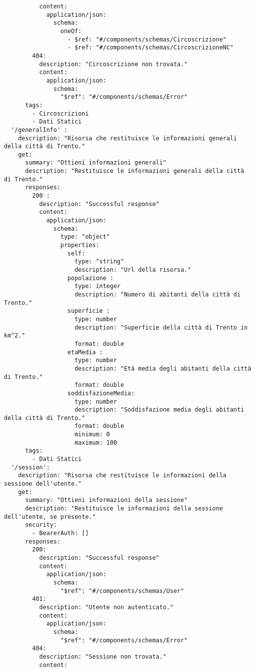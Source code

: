\begin{verbatim}
          content:
            application/json: 
              schema: 
                oneOf:
                  - $ref: "#/components/schemas/Circoscrizione"
                  - $ref: "#/components/schemas/CircoscrizioneNC"
        404: 
          description: "Circoscrizione non trovata."
          content: 
            application/json: 
              schema: 
                "$ref": "#/components/schemas/Error"
      tags:
        - Circoscrizioni
        - Dati Statici
  '/generalInfo' :
    description: "Risorsa che restituisce le informazioni generali della città di Trento."
    get: 
      summary: "Ottieni informazioni generali"
      description: "Restituisce le informazioni generali della città di Trento."
      responses: 
        200 : 
          description: "Successful response"
          content: 
            application/json:
              schema: 
                type: "object"
                properties: 
                  self:
                    type: "string"
                    description: "Url della risorsa."
                  popolazione :
                    type: integer
                    description: "Numero di abitanti della città di Trento."
                  superficie :
                    type: number
                    description: "Superficie della città di Trento in km^2."
                    format: double
                  etaMedia :
                    type: number
                    description: "Età media degli abitanti della città di Trento."
                    format: double
                  soddisfazioneMedia: 
                    type: number
                    description: "Soddisfazione media degli abitanti della città di Trento."
                    format: double
                    minimum: 0
                    maximum: 100
      tags:
        - Dati Statici
  '/session':
    description: "Risorsa che restituisce le informazioni della sessione dell'utente."
    get:
      summary: "Ottieni informazioni della sessione"
      description: "Restituisce le informazioni della sessione dell'utente, se presente."
      security:
        - BearerAuth: []
      responses:
        200:
          description: "Successful response"
          content:
            application/json:
              schema:
                "$ref": "#/components/schemas/User"
        401:
          description: "Utente non autenticato."
          content:
            application/json:
              schema:
                "$ref": "#/components/schemas/Error"
        404:
          description: "Sessione non trovata."
          content:

\end{verbatim}
